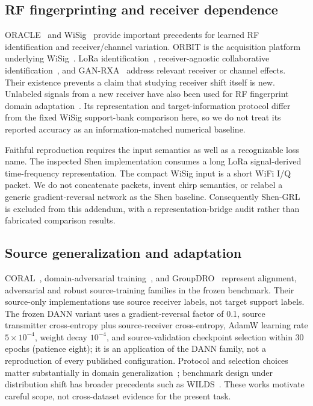 \subsection{RF fingerprinting and receiver dependence}
ORACLE~\cite{oracle} and WiSig~\cite{wisig} provide important precedents for learned RF identification and receiver/channel variation. ORBIT is the acquisition platform underlying WiSig~\cite{orbit}. LoRa identification~\cite{shenlora}, receiver-agnostic collaborative identification~\cite{shen}, and GAN-RXA~\cite{ganrxa} address relevant receiver or channel effects. Their existence prevents a claim that studying receiver shift itself is new.
Unlabeled signals from a new receiver have also been used for RF fingerprint domain adaptation~\cite{yang_receiver_adapt}. Its representation and target-information protocol differ from the fixed WiSig support-bank comparison here, so we do not treat its reported accuracy as an information-matched numerical baseline.

Faithful reproduction requires the input semantics as well as a recognizable loss name. The inspected Shen implementation consumes a long LoRa signal-derived time-frequency representation. The compact WiSig input is a short WiFi I/Q packet. We do not concatenate packets, invent chirp semantics, or relabel a generic gradient-reversal network as the Shen baseline. Consequently Shen-GRL is excluded from this addendum, with a representation-bridge audit rather than fabricated comparison results.

\subsection{Source generalization and adaptation}
CORAL~\cite{coral}, domain-adversarial training~\cite{dann}, and GroupDRO~\cite{groupdro} represent alignment, adversarial and robust source-training families in the frozen benchmark. Their source-only implementations use source receiver labels, not target support labels. The frozen DANN variant uses a gradient-reversal factor of 0.1, source transmitter cross-entropy plus source-receiver cross-entropy, AdamW learning rate $5\times10^{-4}$, weight decay $10^{-4}$, and source-validation checkpoint selection within 30 epochs (patience eight); it is an application of the DANN family, not a reproduction of every published configuration. Protocol and selection choices matter substantially in domain generalization~\cite{domainbed}; benchmark design under distribution shift has broader precedents such as WILDS~\cite{wilds}. These works motivate careful scope, not cross-dataset evidence for the present task.

